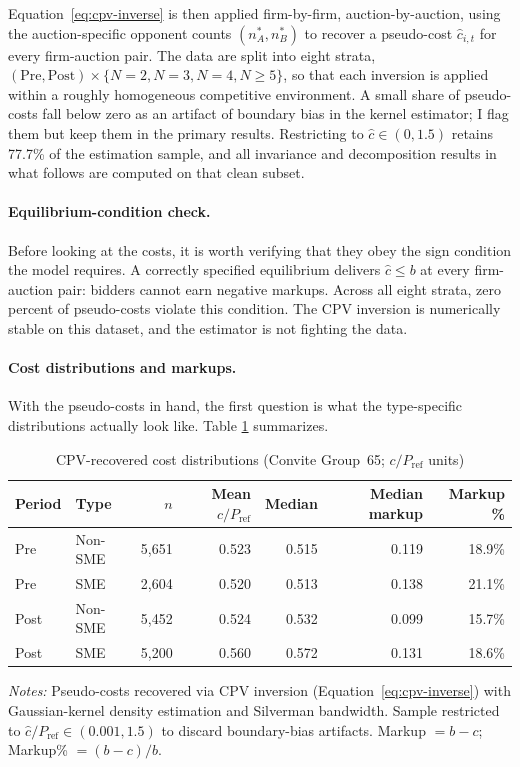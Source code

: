 \documentclass[12pt]{article}
\begin{document}
Equation~\eqref{eq:cpv-inverse} is then applied firm-by-firm,
auction-by-auction, using the auction-specific opponent counts
$(n_A^*, n_B^*)$ to recover a pseudo-cost $\hat c_{i,t}$ for
every firm-auction pair. The data are split into eight strata,
$(\text{Pre}, \text{Post}) \times \{N=2, N=3, N=4, N \ge 5\}$, so
that each inversion is applied within a roughly homogeneous
competitive environment. A small share of pseudo-costs fall
below zero as an artifact of boundary bias in the kernel
estimator; I flag them but keep them in the primary results.
Restricting to $\hat c \in (0, 1.5)$ retains 77.7\% of the
estimation sample, and all invariance and decomposition results
in what follows are computed on that clean subset.

\paragraph{Equilibrium-condition check.}
Before looking at the costs, it is worth verifying that they
obey the sign condition the model requires. A correctly specified
equilibrium delivers $\hat c \leq b$ at every firm-auction pair:
bidders cannot earn negative markups. Across all eight strata,
zero percent of pseudo-costs violate this condition. The CPV
inversion is numerically stable on this dataset, and the
estimator is not fighting the data.

\paragraph{Cost distributions and markups.}
With the pseudo-costs in hand, the first question is what the
type-specific distributions actually look like. Table
\ref{tab:cost-summary} summarizes.

\begin{table}[htbp]
\centering
\caption{CPV-recovered cost distributions (Convite Group~65; $c/P_{\text{ref}}$ units)}
\label{tab:cost-summary}
\begin{threeparttable}
\small
\begin{tabular}{llrrrrr}
\toprule
Period & Type & $n$ & Mean $c/P_{\text{ref}}$ & Median &
  Median markup & Markup \% \\
\midrule
Pre   & Non-SME   & 5{,}651 & 0.523 & 0.515 & 0.119 & 18.9\% \\
Pre   & SME       & 2{,}604 & 0.520 & 0.513 & 0.138 & 21.1\% \\
Post  & Non-SME   & 5{,}452 & 0.524 & 0.532 & 0.099 & 15.7\% \\
Post  & SME       & 5{,}200 & 0.560 & 0.572 & 0.131 & 18.6\% \\
\bottomrule
\end{tabular}
\begin{tablenotes}
\footnotesize
\item \textit{Notes:} Pseudo-costs recovered via CPV inversion
(Equation~\ref{eq:cpv-inverse}) with Gaussian-kernel density
estimation and Silverman bandwidth. Sample restricted to
$\hat c/P_{\text{ref}} \in (0.001, 1.5)$ to discard boundary-bias
artifacts. Markup $= b - c$; Markup\% $= (b-c)/b$.
\end{tablenotes}
\end{threeparttable}
\end{table}
\end{document}
